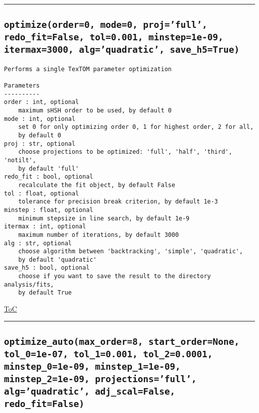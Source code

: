 \documentclass{article}
\begin{document}


\vspace{5mm}

\hrule

\subsection*{\texttt{optimize(order=0, mode=0, proj='full', redo\_fit=False, tol=0.001, minstep=1e-09, itermax=3000, alg='quadratic', save\_h5=True)}}

\begin{lstlisting}[language=docstring]
Performs a single TexTOM parameter optimization

Parameters
----------
order : int, optional
    maximum sHSH order to be used, by default 0
mode : int, optional
    set 0 for only optimizing order 0, 1 for highest order, 2 for all,
    by default 0
proj : str, optional
    choose projections to be optimized: 'full', 'half', 'third', 'notilt', 
    by default 'full'
redo_fit : bool, optional
    recalculate the fit object, by default False
tol : float, optional
    tolerance for precision break criterion, by default 1e-3
minstep : float, optional
    minimum stepsize in line search, by default 1e-9
itermax : int, optional
    maximum number of iterations, by default 3000
alg : str, optional
    choose algorithm between 'backtracking', 'simple', 'quadratic', 
    by default 'quadratic'
save_h5 : bool, optional
    choose if you want to save the result to the directory analysis/fits, 
    by default True    
\end{lstlisting}

\begin{flushright}

\hyperref[toc]{ToC}

\end{flushright}



\vspace{5mm}

\hrule

\subsection*{\texttt{optimize\_auto(max\_order=8, start\_order=None, tol\_0=1e-07, tol\_1=0.001, tol\_2=0.0001, minstep\_0=1e-09, minstep\_1=1e-09, minstep\_2=1e-09, projections='full', alg='quadratic', adj\_scal=False, redo\_fit=False)}}
\end{document}
